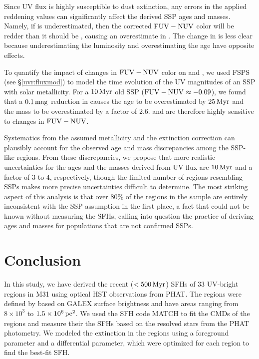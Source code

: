Since UV flux is highly susceptible to dust extinction, any errors in the
applied reddening values can significantly affect the derived SSP ages and
masses. Namely, if \ebv{} is underestimated, then the corrected
$\mathrm{FUV} - \mathrm{NUV}$ color will be redder than it should be \citep[assuming the
extinction curve of][although this is another potential source of
uncertainty]{Cardelli:1989}, causing an overestimate in \agessp{}. The
change in \massssp{} is less clear because underestimating the \fuv{}
luminosity and overestimating the age have opposite effects.

To quantify the impact of changes in $\mathrm{FUV} - \mathrm{NUV}$ color on
\agessp{} and \massssp{}, we used FSPS (see \S \ref{uvr:fluxmod})
to model the time evolution of the UV magnitudes of an SSP with solar
metallicity. For a $10\,\mathrm{Myr}$ old SSP ($\mathrm{FUV} - \mathrm{NUV} \approx
-0.09$), we found that a $0.1\,\mathrm{mag}$ reduction in \ebv{}
causes the age to be overestimated by $25\,\mathrm{Myr}$ and the mass to be
overestimated by a factor of 2.6. \agessp{} and \massssp{} are
therefore highly sensitive to changes in $\mathrm{FUV} - \mathrm{NUV}$.

Systematics from the assumed metallicity and the extinction correction can
plausibly account for the observed age and mass discrepancies among the
SSP-like regions. From these discrepancies, we propose that more realistic
uncertainties for the ages and the masses derived from UV flux are
$10\,\mathrm{Myr}$ and a factor of 3 to 4, respectively, though the limited
number of regions resembling SSPs makes more precise uncertainties difficult to
determine. The most striking aspect of this analysis is that over 80\% of the
regions in the sample are entirely inconsistent with the SSP assumption in the
first place, a fact that could not be known without measuring the SFHs, calling
into question the practice of deriving ages and masses for populations that are
not confirmed SSPs.





\section{Conclusion}\label{uvr:conclusion}

In this study, we have derived the recent ($< 500\,\mathrm{Myr}$) SFHs of 33
UV-bright regions in M31 using optical HST observations from PHAT. The regions
were defined by  based on GALEX \fuv{} surface brightness and
have areas ranging from $8 \times 10^3$ to $1.5 \times 10^6\,\mathrm{pc}^2$. We
used the SFH code MATCH to fit the CMDs of the regions and measure their the
SFHs based on the resolved stars from the PHAT photometry. We modeled the
extinction in the regions using a foreground parameter and a differential
parameter, which were optimized for each region to find the best-fit SFH.

